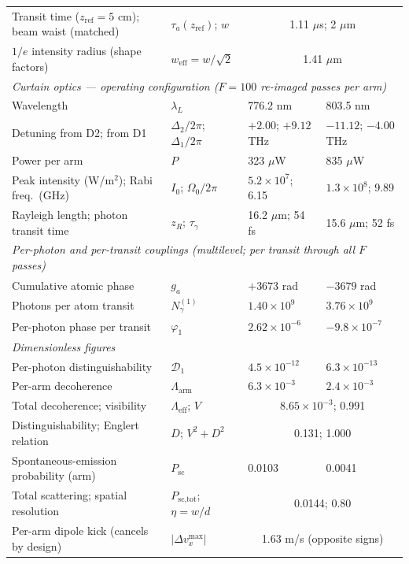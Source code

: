 \documentclass[11pt,a4paper]{article}
\begin{document}
\begin{table}[htbp]
{\begin{tabular}{llll}
Transit time ($z_\text{ref}{=}5$ cm); beam waist (matched) & $\tau_a(z_\text{ref})$; $w$ & \multicolumn{2}{c}{1.11 $\mu$s; 2 $\mu$m} \\
$1/e$ intensity radius (shape factors) & $w_\text{eff} = w/\sqrt{2}$ & \multicolumn{2}{c}{1.41 $\mu$m} \\
\midrule
\multicolumn{4}{l}{\emph{Curtain optics --- operating configuration ($F = 100$ re-imaged passes per arm)}}\\
Wavelength & $\lambda_L$ & 776.2 nm & 803.5 nm \\
Detuning from D2; from D1 & $\Delta_2/2\pi$; $\Delta_1/2\pi$ & $+2.00$; $+9.12$ THz & $-11.12$; $-4.00$ THz \\
Power per arm & $P$ & 323 $\mu$W & 835 $\mu$W \\
Peak intensity (W/m$^2$); Rabi freq.\ (GHz) & $I_0$; $\Omega_0/2\pi$ & $5.2\times 10^7$; 6.15 & $1.3\times 10^8$; 9.89 \\
Rayleigh length; photon transit time & $z_R$; $\tau_\gamma$ & 16.2 $\mu$m; 54 fs & 15.6 $\mu$m; 52 fs \\
\midrule
\multicolumn{4}{l}{\emph{Per-photon and per-transit couplings (multilevel; per transit through all $F$ passes)}}\\
Cumulative atomic phase & $g_a$ & $+3673$ rad & $-3679$ rad \\
Photons per atom transit & $N_\gamma^{(1)}$ & $1.40\times 10^9$ & $3.76\times 10^9$ \\
Per-photon phase per transit & $\varphi_1$ & $2.62\times 10^{-6}$ & $-9.8\times 10^{-7}$ \\
\midrule
\multicolumn{4}{l}{\emph{Dimensionless figures}}\\
Per-photon distinguishability & $\mathcal{D}_1$ & $4.5\times 10^{-12}$ & $6.3\times 10^{-13}$ \\
Per-arm decoherence & $\Lambda_\text{arm}$ & $6.3\times 10^{-3}$ & $2.4\times 10^{-3}$ \\
Total decoherence; visibility & $\Lambda_\text{eff}$; $V$ & \multicolumn{2}{c}{$8.65\times 10^{-3}$; 0.991} \\
Distinguishability; Englert relation & $D$; $V^2 + D^2$ & \multicolumn{2}{c}{0.131; 1.000} \\
Spontaneous-emission probability (arm) & $P_\text{sc}$ & 0.0103 & 0.0041 \\
Total scattering; spatial resolution & $P_\text{sc,tot}$; $\eta = w/d$ & \multicolumn{2}{c}{0.0144; 0.80} \\
Per-arm dipole kick (cancels by design) & $|\Delta v_x^\text{max}|$ & \multicolumn{2}{c}{1.63 m/s (opposite signs)} \\

\end{tabular}}
\end{table}
\end{document}
